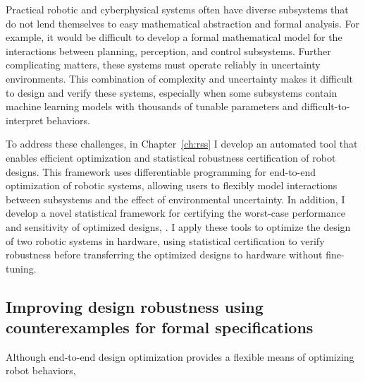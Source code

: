 Practical robotic and cyberphysical systems often have diverse subsystems that do not lend themselves to easy mathematical abstraction and formal analysis. For example, it would be difficult to develop a formal mathematical model for the interactions between planning, perception, and control subsystems. Further complicating matters, these systems must operate reliably in uncertainty environments. This combination of complexity and uncertainty makes it difficult to design and verify these systems, especially when some subsystems contain machine learning models with thousands of tunable parameters and difficult-to-interpret behaviors.

To address these challenges, in Chapter~\ref{ch:rss} I develop an automated tool that enables efficient optimization and statistical robustness certification of robot designs.
This framework uses differentiable programming for end-to-end optimization of robotic systems, allowing users to flexibly model interactions between subsystems and the effect of environmental uncertainty. In addition, I develop a novel statistical framework for certifying the worst-case performance and sensitivity of optimized designs, . I apply these tools to optimize the design of two robotic systems in hardware, using statistical certification to verify robustness before transferring the optimized designs to hardware without fine-tuning.

\subsection{Improving design robustness using counterexamples for formal specifications}

Although end-to-end design optimization provides a flexible means of optimizing robot behaviors, 

